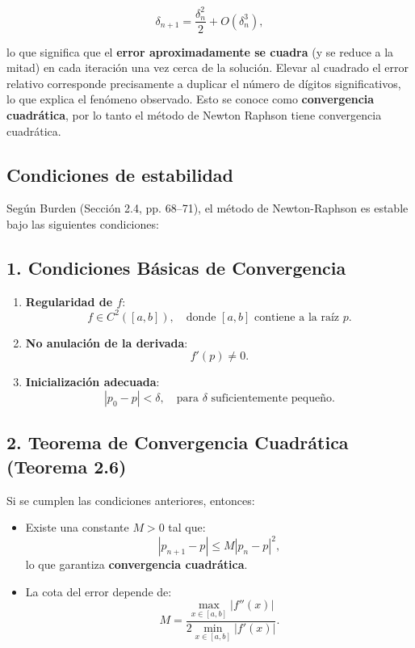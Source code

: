 \documentclass[conference]{IEEEtran}
\begin{document}
\[
\delta_{n+1}=\frac{\delta_{n}^{2}}{2}+O(\delta_{n}^{3}),
\]

lo que significa que el \textbf{error aproximadamente se cuadra} (y se reduce a la mitad) en cada iteración una vez cerca de la solución. Elevar al cuadrado el error relativo corresponde precisamente a duplicar el número de dígitos significativos, lo que explica el fenómeno observado. Esto se conoce como \textbf{convergencia cuadrática}, por lo tanto el método de Newton Raphson tiene convergencia cuadrática.
\subsection{Condiciones de estabilidad}
Según Burden (Sección 2.4, pp. 68--71), el método de Newton-Raphson es estable bajo las siguientes condiciones:

\subsection*{1. Condiciones Básicas de Convergencia}
\begin{enumerate}
    \item \textbf{Regularidad de $f$}:
    \begin{equation}
        f \in C^2([a,b]), \quad \text{donde } [a,b] \text{ contiene a la raíz } p.
    \end{equation}
    
    \item \textbf{No anulación de la derivada}:
    \begin{equation}
        f'(p) \neq 0.
    \end{equation}
    
    \item \textbf{Inicialización adecuada}:
    \begin{equation}
        |p_0 - p| < \delta, \quad \text{para } \delta \text{ suficientemente pequeño}.
    \end{equation}
\end{enumerate}

\subsection*{2. Teorema de Convergencia Cuadrática (Teorema 2.6)}
Si se cumplen las condiciones anteriores, entonces:
\begin{itemize}
    \item Existe una constante $M > 0$ tal que:
    \begin{equation}
        |p_{n+1} - p| \leq M |p_n - p|^2,
    \end{equation}
    lo que garantiza \textbf{convergencia cuadrática}.
    
    \item La cota del error depende de:
    \begin{equation}
        M = \frac{\max_{x \in [a,b]} |f''(x)|}{2\min_{x \in [a,b]} |f'(x)|}.
    \end{equation}
\end{itemize}
\end{document}
